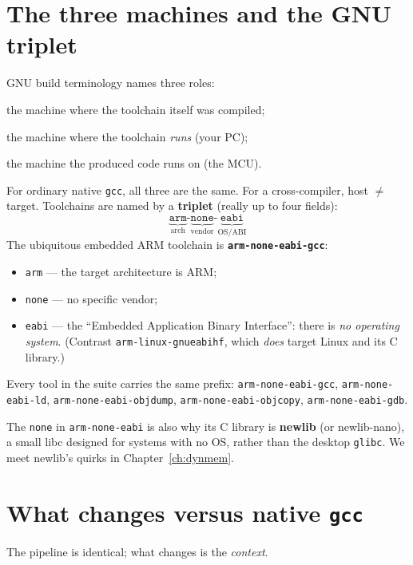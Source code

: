 \documentclass[11pt,a4paper,oneside]{book}
\newcommand{\code}[1]{\texttt{#1}}
\begin{document}
\section{The three machines and the GNU triplet}
GNU build terminology names three roles:
\begin{description}[leftmargin=1.5cm,style=nextline]
  \item[build] the machine where the toolchain itself was compiled;
  \item[host] the machine where the toolchain \emph{runs} (your PC);
  \item[target] the machine the produced code runs on (the MCU).
\end{description}
For ordinary native \code{gcc}, all three are the same. For a cross-compiler,
host $\neq$ target. Toolchains are named by a \textbf{triplet} (really up to
four fields):
\[
\underbrace{\texttt{arm}}_{\text{arch}}\text{-}
\underbrace{\texttt{none}}_{\text{vendor}}\text{-}
\underbrace{\texttt{eabi}}_{\text{OS/ABI}}
\]
The ubiquitous embedded ARM toolchain is \textbf{\code{arm-none-eabi-gcc}}:
\begin{itemize}[leftmargin=1.4cm]
  \item \code{arm} --- the target architecture is ARM;
  \item \code{none} --- no specific vendor;
  \item \code{eabi} --- the ``Embedded Application Binary Interface'': there is
        \emph{no operating system}. (Contrast \code{arm-linux-gnueabihf}, which
        \emph{does} target Linux and its C library.)
\end{itemize}
Every tool in the suite carries the same prefix: \code{arm-none-eabi-gcc},
\code{arm-none-eabi-ld}, \code{arm-none-eabi-objdump},
\code{arm-none-eabi-objcopy}, \code{arm-none-eabi-gdb}.

\begin{note}
The \code{none} in \code{arm-none-eabi} is also why its C library is
\textbf{newlib} (or newlib-nano), a small libc designed for systems with no OS,
rather than the desktop \code{glibc}. We meet newlib's quirks in
Chapter~\ref{ch:dynmem}.
\end{note}

\section{What changes versus native \texttt{gcc}}

The pipeline is identical; what changes is the \emph{context}.
\end{document}
